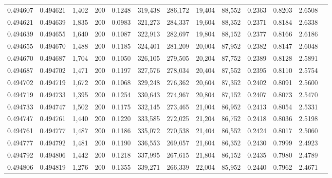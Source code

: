 \begin{tabular}{rrrrrrrrrrrrr}
0.494607 & 0.494621 &  1,402 & 200 &                                     0.1248 & 319,438 & 286,172 &  19,404 &  88,552 & 0.2363 & 0.8203 & 2.6508 \\
0.494621 & 0.494639 &  1,835 & 200 &                                     0.0983 & 321,273 & 284,337 &  19,604 &  88,352 & 0.2371 & 0.8184 & 2.6338 \\
0.494639 & 0.494655 &  1,640 & 200 &                                     0.1087 & 322,913 & 282,697 &  19,804 &  88,152 & 0.2377 & 0.8166 & 2.6186 \\
0.494655 & 0.494670 &  1,488 & 200 &                                     0.1185 & 324,401 & 281,209 &  20,004 &  87,952 & 0.2382 & 0.8147 & 2.6048 \\
0.494670 & 0.494687 &  1,704 & 200 &                                     0.1050 & 326,105 & 279,505 &  20,204 &  87,752 & 0.2389 & 0.8128 & 2.5891 \\
0.494687 & 0.494702 &  1,471 & 200 &                                     0.1197 & 327,576 & 278,034 &  20,404 &  87,552 & 0.2395 & 0.8110 & 2.5754 \\
0.494702 & 0.494719 &  1,672 & 200 &                                     0.1068 & 329,248 & 276,362 &  20,604 &  87,352 & 0.2402 & 0.8091 & 2.5600 \\
0.494719 & 0.494733 &  1,395 & 200 &                                     0.1254 & 330,643 & 274,967 &  20,804 &  87,152 & 0.2407 & 0.8073 & 2.5470 \\
0.494733 & 0.494747 &  1,502 & 200 &                                     0.1175 & 332,145 & 273,465 &  21,004 &  86,952 & 0.2413 & 0.8054 & 2.5331 \\
0.494747 & 0.494761 &  1,440 & 200 &                                     0.1220 & 333,585 & 272,025 &  21,204 &  86,752 & 0.2418 & 0.8036 & 2.5198 \\
0.494761 & 0.494777 &  1,487 & 200 &                                     0.1186 & 335,072 & 270,538 &  21,404 &  86,552 & 0.2424 & 0.8017 & 2.5060 \\
0.494777 & 0.494792 &  1,481 & 200 &                                     0.1190 & 336,553 & 269,057 &  21,604 &  86,352 & 0.2430 & 0.7999 & 2.4923 \\
0.494792 & 0.494806 &  1,442 & 200 &                                     0.1218 & 337,995 & 267,615 &  21,804 &  86,152 & 0.2435 & 0.7980 & 2.4789 \\
0.494806 & 0.494819 &  1,276 & 200 &                                     0.1355 & 339,271 & 266,339 &  22,004 &  85,952 & 0.2440 & 0.7962 & 2.4671 \\

\end{tabular}
